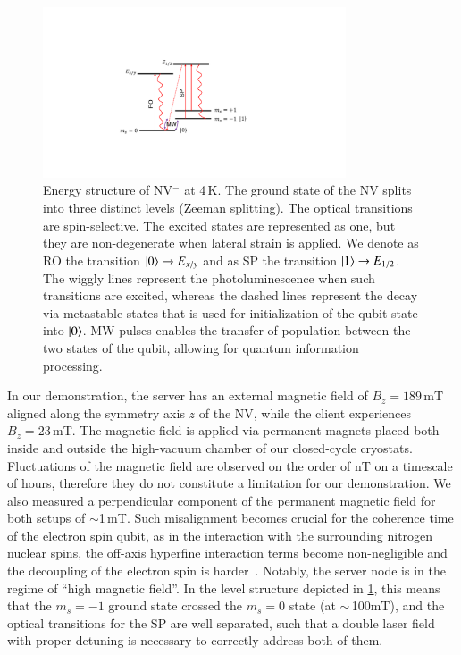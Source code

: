 \begin{figure}
    \centering
    \includegraphics[width=0.8\textwidth]{figures/qnodeos/supplementary/levels_NV.pdf}
    \caption{Energy structure of \ac{NV}$^-$ at 4\,K. The ground state of the \ac{NV} splits into three distinct levels (Zeeman splitting). The optical transitions are spin-selective. The excited states are represented as one, but they are non-degenerate when lateral strain is applied. We denote as \acf{RO} the transition $\ket{0}\rightarrow E_{x/y}$ and as \acf{SP} the transition $\ket{1}\rightarrow E_{1/2}$. The wiggly lines represent the photoluminescence when such transitions are excited, whereas the dashed lines represent the decay via metastable states that is used for initialization of the qubit state into $\ket{0}$. \acf{MW} pulses enables the transfer of population between the two states of the qubit, allowing for quantum information processing.}
    \label{qnodeos:fig:nv_levels}
\end{figure}

In our demonstration, the server has an external magnetic field of $B_z=189$\,mT aligned along the symmetry axis $z$ of the \ac{NV}, while the client experiences $B_z=23$\,mT. The magnetic field is applied via permanent magnets placed both inside and outside the high-vacuum chamber of our closed-cycle cryostats. Fluctuations of the magnetic field are observed on the order of nT on a timescale of hours, therefore they do not constitute a limitation for our demonstration. We also measured a perpendicular component of the permanent magnetic field for both setups of $\sim$1\,mT. Such misalignment becomes crucial for the coherence time of the electron spin qubit, as in the interaction with the surrounding nitrogen nuclear spins, the off-axis hyperfine interaction terms become non-negligible and the decoupling of the electron spin is harder~\cite{doherty_2013}. Notably, the server node is in the regime of ``high magnetic field''. In the level structure depicted in \cref{qnodeos:fig:nv_levels}, this means that the $m_s=-1$ ground state crossed the $m_s=0$ state (at $\sim$\,100mT), and the optical transitions for the \ac{SP} are well separated, such that a double laser field with proper detuning is necessary to correctly address both of them.

